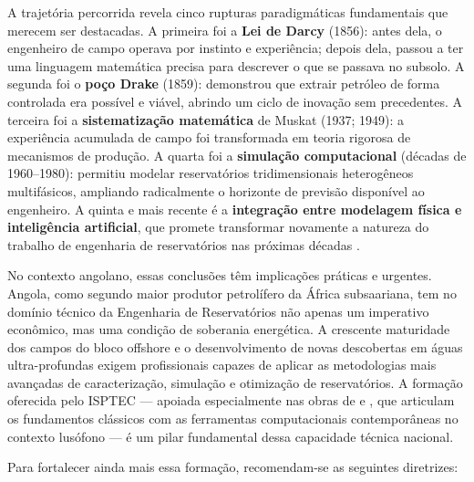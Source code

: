 \documentclass[
  12pt,
  a4paper,
  oneside,
  brazilian,
  sumario=tradicional
]{abntex2}
\begin{document}
A trajetória percorrida revela cinco rupturas paradigmáticas
fundamentais que merecem ser destacadas. A primeira foi a
\textbf{Lei de Darcy} (1856): antes dela, o engenheiro de campo
operava por instinto e experiência; depois dela, passou a ter uma
linguagem matemática precisa para descrever o que se passava no
subsolo. A segunda foi o \textbf{poço Drake} (1859): demonstrou que
extrair petróleo de forma controlada era possível e viável, abrindo
um ciclo de inovação sem precedentes. A terceira foi a
\textbf{sistematização matemática} de Muskat (1937; 1949): a
experiência acumulada de campo foi transformada em teoria rigorosa de
mecanismos de produção. A quarta foi a \textbf{simulação
computacional} (décadas de 1960--1980): permitiu modelar reservatórios
tridimensionais heterogêneos multifásicos, ampliando radicalmente o
horizonte de previsão disponível ao engenheiro. A quinta e mais
recente é a \textbf{integração entre modelagem física e inteligência
artificial}, que promete transformar novamente a natureza do trabalho
de engenharia de reservatórios nas próximas décadas
\cite{dake2014, yergin1991, peaceman1977, ramos2020}.

No contexto angolano, essas conclusões têm implicações práticas e
urgentes. Angola, como segundo maior produtor petrolífero da África
subsaariana, tem no domínio técnico da Engenharia de Reservatórios
não apenas um imperativo econômico, mas uma condição de soberania
energética. A crescente maturidade dos campos do bloco offshore e o
desenvolvimento de novas descobertas em águas ultra-profundas exigem
profissionais capazes de aplicar as metodologias mais avançadas de
caracterização, simulação e otimização de reservatórios. A formação
oferecida pelo ISPTEC — apoiada especialmente nas obras de
\cite{ramos2016} e \cite{ramos2020}, que articulam os fundamentos
clássicos com as ferramentas computacionais contemporâneas no contexto
lusófono — é um pilar fundamental dessa capacidade técnica nacional.

Para fortalecer ainda mais essa formação, recomendam-se as seguintes
diretrizes:
\end{document}

